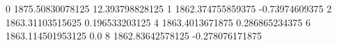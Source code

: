 0 1875.50830078125 12.393798828125
1 1862.374755859375 -0.73974609375
2 1863.31103515625 0.196533203125
4 1863.4013671875 0.286865234375
6 1863.114501953125 0.0
8 1862.83642578125 -0.278076171875
